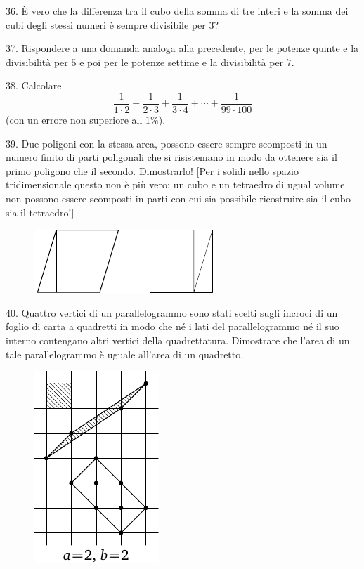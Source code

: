 \begin{problem}{36.}
È vero che la differenza tra il cubo della somma di tre interi e la somma dei cubi degli stessi numeri  è sempre divisibile per $3$?
\end{problem}

\begin{problem}{37.}
	Rispondere a una domanda analoga alla precedente, per le potenze quinte e la divisibilità per $5$ e poi per le potenze settime e la divisibilità per $7$.
\end{problem}

\begin{problem}{38.}
	Calcolare
	\begin{equation*}
		\frac{1}{1\cdot 2} + \frac{1}{2\cdot 3} + \frac{1}{3\cdot 4} + \dotsb + \frac{1}{99\cdot 100}
	\end{equation*}
	(con un errore non superiore all $1\%$).
\end{problem}

\begin{problem}{39.}
	Due poligoni con la stessa area, possono essere sempre scomposti in un numero finito di parti poligonali che si risistemano in modo da ottenere sia il primo poligono che il secondo. Dimostrarlo! [Per i solidi nello spazio tridimensionale questo non è più vero: un cubo e un tetraedro di ugual  volume non possono essere scomposti in parti con cui sia possibile ricostruire sia il cubo sia il tetraedro!]
	\begin{figure}
		\includegraphics{resources/q39_horizontal}
	\end{figure}
\end{problem}

\begin{problem}{40.}
	Quattro vertici di un parallelogrammo sono stati scelti sugli incroci di un foglio di carta a quadretti in modo che né i lati del parallelogrammo né il suo interno contengano altri vertici della quadrettatura. Dimostrare che l’area di un tale parallelogrammo è uguale all’area di un quadretto.
	\begin{figure}
		\includegraphics{resources/taskbook-24}
	\end{figure}
\end{problem}

